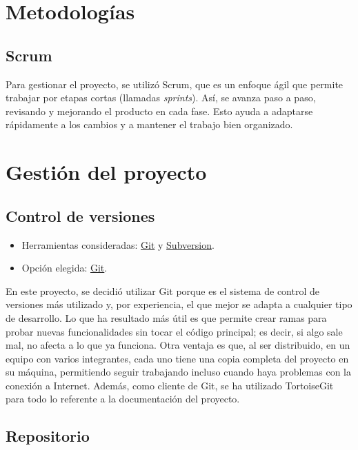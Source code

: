 
\section{Metodologías}\label{metodologias}

\subsection{Scrum}\label{scrum}
Para gestionar el proyecto, se utilizó Scrum, que es un enfoque ágil que permite trabajar por etapas cortas (llamadas \emph{sprints}). Así, se avanza paso a paso, revisando y mejorando el producto en cada fase. Esto ayuda a adaptarse rápidamente a los cambios y a mantener el trabajo bien organizado.

\section{Gestión del proyecto}\label{gestion-del-proyecto}

\subsection{Control de versiones}\label{control-de-versiones}

\begin{itemize}
\tightlist
\item
  Herramientas consideradas: \href{https://git-scm.com/}{Git} y
  \href{https://subversion.apache.org/}{Subversion}.
\item
  Opción elegida: \href{https://git-scm.com/}{Git}.
\end{itemize}

En este proyecto, se decidió utilizar Git porque es el sistema de control de versiones más utilizado y, por experiencia, el que mejor se adapta a cualquier tipo de desarrollo. Lo que ha resultado más útil es que permite crear ramas para probar nuevas funcionalidades sin tocar el código principal; es decir, si algo sale mal, no afecta a lo que ya funciona. Otra ventaja es que, al ser distribuido, en un equipo con varios integrantes, cada uno tiene una copia completa del proyecto en su máquina, permitiendo seguir trabajando incluso cuando haya problemas con la conexión a Internet. Además, como cliente de Git, se ha utilizado TortoiseGit~\cite{tortoisegit} para todo lo referente a la documentación del proyecto.

\subsection{Repositorio}\label{repositorio}

